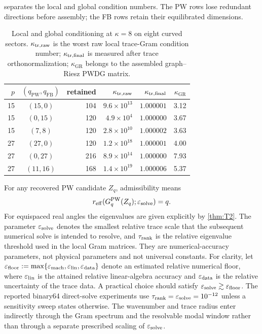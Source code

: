 \documentclass[11pt]{article}
\newcommand{\GR}{\mathrm{GR}}
\newcommand{\PW}{\mathrm{PW}}
\newcommand{\FB}{\mathrm{FB}}
\numberwithin{equation}{section}
\begin{document}
 separates the local and global condition numbers.  The PW rows lose redundant directions before assembly; the FB rows retain their equilibrated dimensions.

\begin{table}[htbp]
\centering
\caption{Local and global conditioning at $\kappa=8$ on eight curved sectors.  $\kappa_{\rm tr,raw}$ is the worst raw local trace-Gram condition number; $\kappa_{\rm tr,final}$ is measured after trace orthonormalization; $\kappa_{\GR}$ belongs to the assembled graph--Riesz PWDG matrix.}
\label{tab:conditioned-pipeline}
\footnotesize
\begin{tabular}{rcrrrr}
\toprule
$p$ & $(q_{\PW},q_{\FB})$ & retained & $\kappa_{\rm tr,raw}$ & $\kappa_{\rm tr,final}$ & $\kappa_{\GR}$\\
\midrule
15 & $(15,0)$ & 104 & $9.6\times10^{13}$ & $1.000001$ & 3.12\\
15 & $(0,15)$ & 120 & $4.9\times10^{4}$ & $1.000000$ & 3.67\\
15 & $(7,8)$  & 120 & $2.8\times10^{10}$ & $1.000002$ & 3.63\\
27 & $(27,0)$ & 120 & $1.2\times10^{18}$ & $1.000001$ & 4.00\\
27 & $(0,27)$ & 216 & $8.9\times10^{14}$ & $1.000000$ & 7.93\\
27 & $(11,16)$& 168 & $1.4\times10^{19}$ & $1.000006$ & 5.37\\
\bottomrule
\end{tabular}
\end{table}

For any recovered PW candidate $Z_q$, admissibility means
\begin{equation}\label{eq:rank-admissible}
 r_{\rm eff}(G_q^{\PW}(Z_q);\varepsilon_{\rm solve})=q.
\end{equation}
For equispaced real angles the eigenvalues are given explicitly by \cref{thm:T2}.  The parameter $\varepsilon_{\rm solve}$ denotes the smallest relative trace scale that the subsequent numerical solve is intended to resolve, and $\tau_{\rm rank}$ is the relative eigenvalue threshold used in the local Gram matrices.  They are numerical-accuracy parameters, not physical parameters and not universal constants.  For clarity, let $\varepsilon_{\rm floor}:=\max\{\varepsilon_{\rm mach},\varepsilon_{\rm lin},\varepsilon_{\rm data}\}$ denote an estimated relative numerical floor, where $\varepsilon_{\rm lin}$ is the attained relative linear-algebra accuracy and $\varepsilon_{\rm data}$ is the relative uncertainty of the trace data.  A practical choice should satisfy $\varepsilon_{\rm solve}\gtrsim\varepsilon_{\rm floor}$.  The reported binary64 direct-solve experiments use $\tau_{\rm rank}=\varepsilon_{\rm solve}=10^{-12}$ unless a sensitivity sweep states otherwise.  The wavenumber and trace radius enter indirectly through the Gram spectrum and the resolvable modal window rather than through a separate prescribed scaling of $\varepsilon_{\rm solve}$.
\end{document}
